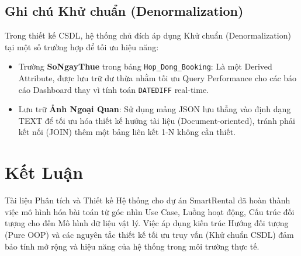 \documentclass[12pt,a4paper]{report}
\begin{document}
\section{Ghi chú Khử chuẩn (Denormalization)}
Trong thiết kế CSDL, hệ thống chủ đích áp dụng Khử chuẩn (Denormalization) tại một số trường hợp để tối ưu hiệu năng:
\begin{itemize}
    \item Trường \textbf{SoNgayThue} trong bảng \texttt{Hop\_Dong\_Booking}: Là một Derived Attribute, được lưu trữ dư thừa nhằm tối ưu Query Performance cho các báo cáo Dashboard thay vì tính toán \texttt{DATEDIFF} real-time.
    \item Lưu trữ \textbf{Ảnh Ngoại Quan}: Sử dụng mảng JSON lưu thẳng vào định dạng TEXT để tối ưu hóa thiết kế hướng tài liệu (Document-oriented), tránh phải kết nối (JOIN) thêm một bảng liên kết 1-N không cần thiết.
\end{itemize}

\chapter{Kết Luận}
Tài liệu Phân tích và Thiết kế Hệ thống cho dự án SmartRental đã hoàn thành việc mô hình hóa bài toán từ góc nhìn Use Case, Luồng hoạt động, Cấu trúc đối tượng cho đến Mô hình dữ liệu vật lý. Việc áp dụng kiến trúc Hướng đối tượng (Pure OOP) và các nguyên tắc thiết kế tối ưu truy vấn (Khử chuẩn CSDL) đảm bảo tính mở rộng và hiệu năng của hệ thống trong môi trường thực tế.
\end{document}
